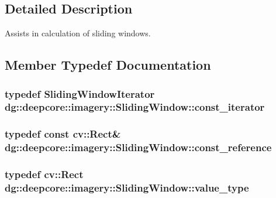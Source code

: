\subsection{Detailed Description}
Assists in calculation of sliding windows. 

\subsection{Member Typedef Documentation}
\subsubsection[{\texorpdfstring{const\+\_\+iterator}{const_iterator}}]{\setlength{\rightskip}{0pt plus 5cm}typedef {\bf Sliding\+Window\+Iterator} {\bf dg\+::deepcore\+::imagery\+::\+Sliding\+Window\+::const\+\_\+iterator}}\hypertarget{classdg_1_1deepcore_1_1imagery_1_1_sliding_window_aca1804ceef890966623a8acfcd01f2e9}{}\label{classdg_1_1deepcore_1_1imagery_1_1_sliding_window_aca1804ceef890966623a8acfcd01f2e9}
\subsubsection[{\texorpdfstring{const\+\_\+reference}{const_reference}}]{\setlength{\rightskip}{0pt plus 5cm}typedef const cv\+::\+Rect\& {\bf dg\+::deepcore\+::imagery\+::\+Sliding\+Window\+::const\+\_\+reference}}\hypertarget{classdg_1_1deepcore_1_1imagery_1_1_sliding_window_a73353ca1fb994a367f73d6d079b170e9}{}\label{classdg_1_1deepcore_1_1imagery_1_1_sliding_window_a73353ca1fb994a367f73d6d079b170e9}
\subsubsection[{\texorpdfstring{value\+\_\+type}{value_type}}]{\setlength{\rightskip}{0pt plus 5cm}typedef cv\+::\+Rect {\bf dg\+::deepcore\+::imagery\+::\+Sliding\+Window\+::value\+\_\+type}}\hypertarget{classdg_1_1deepcore_1_1imagery_1_1_sliding_window_aa709c18e431e937e57b72a869e2bf272}{}\label{classdg_1_1deepcore_1_1imagery_1_1_sliding_window_aa709c18e431e937e57b72a869e2bf272}
